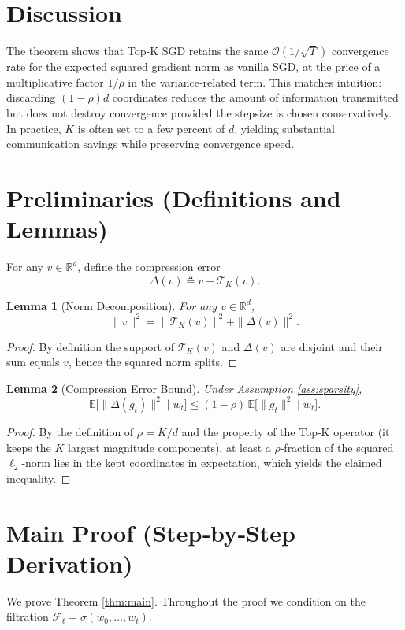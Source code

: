 \documentclass{article}
\newcommand{\E}{\mathbb{E}}
\newcommand{\R}{\mathbb{R}}
\newtheorem{lemma}{Lemma}
\begin{document}
\section*{Discussion}
The theorem shows that Top‑K SGD retains the same $\mathcal{O}(1/\sqrt{T})$ convergence rate for the expected squared gradient norm as vanilla SGD, at the price of a multiplicative factor $1/\rho$ in the variance‑related term. This matches intuition: discarding $(1-\rho)d$ coordinates reduces the amount of information transmitted but does not destroy convergence provided the stepsize is chosen conservatively. In practice, $K$ is often set to a few percent of $d$, yielding substantial communication savings while preserving convergence speed.

\newpage
\section*{Preliminaries (Definitions and Lemmas)}
\begin{definition}
For any $v\in\R^d$, define the compression error
\[
\Delta(v)\triangleq v-\mathcal{T}_K(v).
\]
\end{definition}

\begin{lemma}[Norm Decomposition]
\label{lem:decomp}
For any $v\in\R^d$,
\[
\|v\|^2 = \|\mathcal{T}_K(v)\|^2 + \|\Delta(v)\|^2.
\]
\end{lemma}
\begin{proof}
By definition the support of $\mathcal{T}_K(v)$ and $\Delta(v)$ are disjoint and their sum equals $v$, hence the squared norm splits. \qedhere
\end{proof}

\begin{lemma}[Compression Error Bound]
\label{lem:comp}
Under Assumption \ref{ass:sparsity},
\[
\E\big[\|\Delta(g_t)\|^2\mid w_t\big]\le (1-\rho)\,\E\big[\|g_t\|^2\mid w_t\big].
\]
\end{lemma}
\begin{proof}
By the definition of $\rho=K/d$ and the property of the Top‑K operator (it keeps the $K$ largest magnitude components), at least a $\rho$‑fraction of the squared $\ell_2$‑norm lies in the kept coordinates in expectation, which yields the claimed inequality. \qedhere
\end{proof}

\section*{Main Proof (Step‑by‑Step Derivation)}
We prove Theorem \ref{thm:main}.   Throughout the proof we condition on the filtration $\mathcal{F}_t=\sigma(w_0,\dots,w_t)$.
\end{document}

